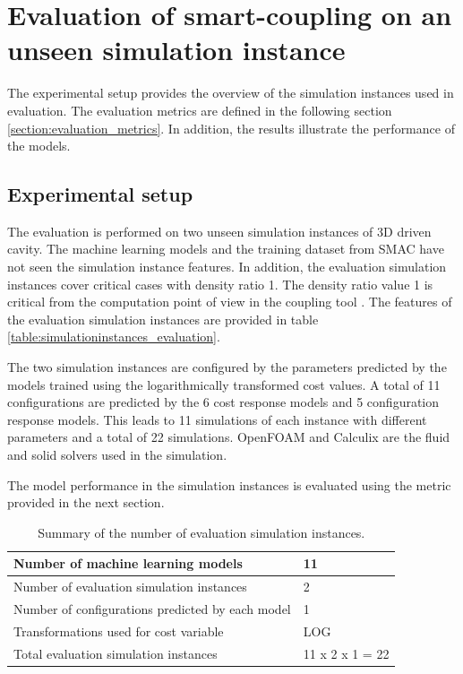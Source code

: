 \section{Evaluation of smart-coupling on an unseen simulation instance}
\label{section:real_eval}

The experimental setup provides the overview of the simulation instances used in evaluation. The evaluation metrics are defined in the following section \ref{section:evaluation_metrics}. In addition, the results illustrate the performance of the models.

\subsection{Experimental setup}
The evaluation is performed on two unseen simulation instances of 3D driven cavity. The machine learning models and the training dataset from SMAC have not seen the simulation instance features. In addition, the evaluation simulation instances cover critical cases with density ratio 1. The density ratio value 1 is critical from the computation point of view in the coupling tool \cite{criticalinstances}. The features of the evaluation simulation instances are provided in table \ref{table:simulationinstances_evaluation}. 

The two simulation instances are configured by the parameters predicted by the models trained using the logarithmically transformed cost values. A total of 11 configurations are predicted by the 6 cost response models and 5 configuration response models. This leads to 11 simulations of each instance with different parameters and a total of 22 simulations. OpenFOAM and Calculix are the fluid and solid solvers used in the simulation.

The model performance in the simulation instances is evaluated using the metric provided in the next section. 

\begin{table}[!ht]
\centering
\begin{tabular}{|l|l|}
\hline
Number of machine learning models & 11 \\ \hline
Number of evaluation simulation instances & 2 \\ \hline
Number of configurations predicted by each model & 1 \\ \hline
Transformations used for cost variable & LOG \\ \hline
Total evaluation simulation instances & 11 x 2 x 1 = 22 \\ \hline
\end{tabular}
\captionsetup{justification=justified}
\caption[Summary of evaluation simulation instances]{Summary of the number of evaluation simulation instances.}
\label{table:totalevaluation}
\end{table}

